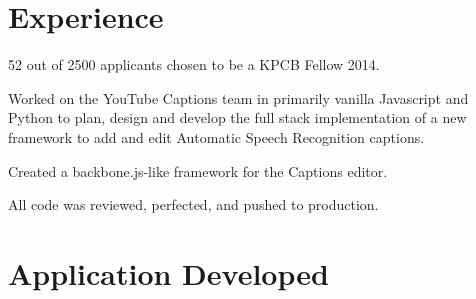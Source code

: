 \documentclass[]{deedy-resume-openfont}
\begin{document}
\begin{minipage}[t]{0.66\textwidth} 


\section{ \textcolor{gray}{} Experience}

\vspace{\topsep} %
\begin{tightemize}\item 52 out of 2500 applicants chosen to be a KPCB Fellow 2014.
\end{tightemize}
\sectionsep

\begin{tightemize}
\item Worked on the YouTube Captions team in primarily vanilla Javascript and Python to plan, design and develop the full stack implementation of a new framework to add and edit Automatic Speech Recognition captions.\item Created a backbone.js-like framework for the Captions editor.\item All code was reviewed, perfected, and pushed to production.\end{tightemize}
\sectionsep
\section{ \textcolor{gray}{} Application Developed}
\begin{tabular}{r|p{11cm}}

\end{tabular}
\end{minipage}
\end{document}
